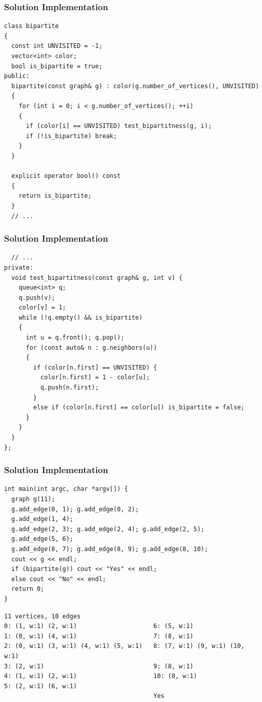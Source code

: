 \documentclass{beamer}
\begin{document}
\begin{frame}[containsverbatim]
\frametitle{Solution Implementation}
\scriptsize
\begin{lstlisting}
class bipartite
{
  const int UNVISITED = -1;
  vector<int> color;
  bool is_bipartite = true;
public:
  bipartite(const graph& g) : color(g.number_of_vertices(), UNVISITED)
  {
    for (int i = 0; i < g.number_of_vertices(); ++i)
    {
      if (color[i] == UNVISITED) test_bipartitness(g, i);
      if (!is_bipartite) break;
    }
  }

  explicit operator bool() const
  {
    return is_bipartite;
  }
  // ...
\end{lstlisting}

\end{frame}

\begin{frame}[containsverbatim]
\frametitle{Solution Implementation}
\scriptsize
\begin{lstlisting}
  // ...
private:
  void test_bipartitness(const graph& g, int v) {
    queue<int> q;
    q.push(v);
    color[v] = 1;
    while (!q.empty() && is_bipartite)
    {
      int u = q.front(); q.pop();
      for (const auto& n : g.neighbors(u))
      {
        if (color[n.first] == UNVISITED) {
          color[n.first] = 1 - color[u];
          q.push(n.first);
        }
        else if (color[n.first] == color[u]) is_bipartite = false;
      }
    }
  }
};
\end{lstlisting}

\end{frame}

\begin{frame}[containsverbatim]
\frametitle{Solution Implementation}
\tiny
\begin{lstlisting}
int main(int argc, char *argv[]) {
  graph g(11);
  g.add_edge(0, 1); g.add_edge(0, 2);
  g.add_edge(1, 4);
  g.add_edge(2, 3); g.add_edge(2, 4); g.add_edge(2, 5);
  g.add_edge(5, 6);
  g.add_edge(8, 7); g.add_edge(8, 9); g.add_edge(8, 10);
  cout << g << endl;
  if (bipartite(g)) cout << "Yes" << endl;
  else cout << "No" << endl;
  return 0;
}
\end{lstlisting}
\scriptsize
\begin{verbatim}
11 vertices, 10 edges
0: (1, w:1) (2, w:1)                     6: (5, w:1)
1: (0, w:1) (4, w:1)                     7: (8, w:1)
2: (0, w:1) (3, w:1) (4, w:1) (5, w:1)   8: (7, w:1) (9, w:1) (10, w:1)
3: (2, w:1)                              9: (8, w:1)
4: (1, w:1) (2, w:1)                     10: (8, w:1)
5: (2, w:1) (6, w:1)
                                         Yes
\end{verbatim}

\end{frame}
\end{document}
